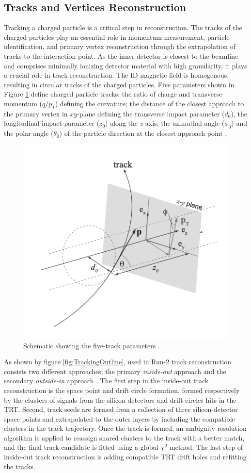 \subsection{Tracks and Vertices Reconstruction}
\label{subsec:Tracking}
Tracking a charged particle is a critical step in reconstruction. The tracks of the charged particles play an essential role in momentum measurement, particle identification, and primary vertex reconstruction through the extrapolation of tracks to the interaction point. As the inner detector is closest to the beamline and comprises minimally ionizing detector material with high granularity, it plays a crucial role in track reconstruction. The ID magnetic field is homogenous, resulting in circular tracks of the charged particles. Five parameters shown in Figure \ref{fig:TrackParameter} define charged particle tracks; the ratio of charge and transverse momentum ($q/p_{T}$) defining the curvature; the distance of the closest approach to the primary vertex in $xy$-plane defining the transverse impact parameter ($d_{0}$), the longitudinal impact parameter ($z_{0}$) along the $z$-axis; the azimuthal angle ($\phi_{0}$) and the polar angle ($\theta_{0}$) of the particle direction at the closest approach point \cite{TrackingRun2_ATLAS}. 

\begin{figure}
    \centering
    \includegraphics[width=.6\linewidth]{figures/LHC/TrackParameters.png}
    \caption{ Schematic showing the five-track parameters \cite{TrackParameterFig}.\label{fig:TrackParameter}}
\end{figure}

As shown by figure \ref{fig:TrackingOutline}, used in Run-2 track reconstruction consists two different approaches; the primary \textit{inside-out} approach and the secondary \textit{outside-in} approach \cite{TrackingRun2_ATLAS}. The first step in the inside-out track reconstruction is the space point and drift circle formation, formed respectively by the clusters of signals from the silicon detectors and drift-circles hits in the TRT. Second, track seeds are formed from a collection of three silicon-detector space points and extrapolated to the outer layers by including the compatible clusters in the track trajectory. Once the track is formed, an ambiguity resolution algorithm is applied to reassign shared clusters to the track with a better match, and the final track candidate is fitted using a global $\chi^{2}$ method. The last step of inside-out track reconstruction is adding compatible TRT drift holes and refitting the tracks. 

